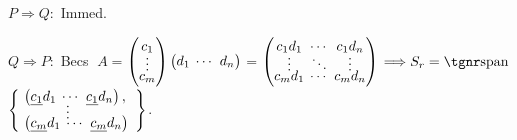 \par\quad
\!\par\quad
$P\Rightarrow Q:$ \;Immed.\par\vspace{-12pt}\quad
$Q\Rightarrow P:$ \;Becs $\;A={}${\normalsize$\begin{pmatrix}c_1 \\[-4pt] \vdots \\[-5pt] c_m \end{pmatrix}\begin{pmatrix}d_1 & \hspace{-6pt}\cdots & \hspace{-6pt}d_n\end{pmatrix}$}${}={}${\normalsize$\begin{pmatrix} c_1 d_1 & \hspace{-6pt}\cdots & \hspace{-6pt}c_1 d_n\\[-4pt] \vdots & \hspace{-6pt}\ddots & \hspace{-6pt}\vdots \\[-5pt] c_m d_1 & \hspace{-6pt}\cdots & \hspace{-6pt}c_m d_n \end{pmatrix}$} $\Longrightarrow S_r=\Spn${\FontSmall$\MathLeftrightBrace{l}{
	\!\begin{pmatrix}\uline{c_1} d_1 & \hspace{-6pt}\cdots & \hspace{-6pt}\uline{c_1} d_n\end{pmatrix},\\[-6pt] \;\;\;\qquad\vdots\\[-6pt]
	\!\begin{pmatrix}\uline{c_m} d_1 & \hspace{-6pt}\cdots & \hspace{-6pt}\uline{c_m} d_n\end{pmatrix}
}%
$}.\par\vspace{0pt}\quad
